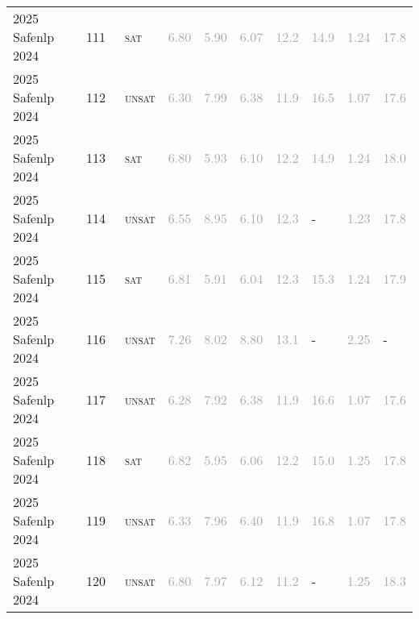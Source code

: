 \begin{center}
{\begin{longtable}{@{}llllllllll@{}}
2025 Safenlp 2024 & 111 & ~\textsc{sat} & \textcolor{darkgray}{6.80} & \textcolor{darkgray}{5.90} & \textcolor{darkgray}{6.07} & \textcolor{darkgray}{12.2} & \textcolor{darkgray}{14.9} & \textcolor{darkgray}{1.24} & \textcolor{darkgray}{17.8} \\
2025 Safenlp 2024 & 112 & ~\textsc{unsat} & \textcolor{darkgray}{6.30} & \textcolor{darkgray}{7.99} & \textcolor{darkgray}{6.38} & \textcolor{darkgray}{11.9} & \textcolor{darkgray}{16.5} & \textcolor{darkgray}{1.07} & \textcolor{darkgray}{17.6} \\
2025 Safenlp 2024 & 113 & ~\textsc{sat} & \textcolor{darkgray}{6.80} & \textcolor{darkgray}{5.93} & \textcolor{darkgray}{6.10} & \textcolor{darkgray}{12.2} & \textcolor{darkgray}{14.9} & \textcolor{darkgray}{1.24} & \textcolor{darkgray}{18.0} \\
2025 Safenlp 2024 & 114 & ~\textsc{unsat} & \textcolor{darkgray}{6.55} & \textcolor{darkgray}{8.95} & \textcolor{darkgray}{6.10} & \textcolor{darkgray}{12.3} & - & \textcolor{darkgray}{1.23} & \textcolor{darkgray}{17.8} \\
2025 Safenlp 2024 & 115 & ~\textsc{sat} & \textcolor{darkgray}{6.81} & \textcolor{darkgray}{5.91} & \textcolor{darkgray}{6.04} & \textcolor{darkgray}{12.3} & \textcolor{darkgray}{15.3} & \textcolor{darkgray}{1.24} & \textcolor{darkgray}{17.9} \\
2025 Safenlp 2024 & 116 & ~\textsc{unsat} & \textcolor{darkgray}{7.26} & \textcolor{darkgray}{8.02} & \textcolor{darkgray}{8.80} & \textcolor{darkgray}{13.1} & - & \textcolor{darkgray}{2.25} & - \\
2025 Safenlp 2024 & 117 & ~\textsc{unsat} & \textcolor{darkgray}{6.28} & \textcolor{darkgray}{7.92} & \textcolor{darkgray}{6.38} & \textcolor{darkgray}{11.9} & \textcolor{darkgray}{16.6} & \textcolor{darkgray}{1.07} & \textcolor{darkgray}{17.6} \\
2025 Safenlp 2024 & 118 & ~\textsc{sat} & \textcolor{darkgray}{6.82} & \textcolor{darkgray}{5.95} & \textcolor{darkgray}{6.06} & \textcolor{darkgray}{12.2} & \textcolor{darkgray}{15.0} & \textcolor{darkgray}{1.25} & \textcolor{darkgray}{17.8} \\
2025 Safenlp 2024 & 119 & ~\textsc{unsat} & \textcolor{darkgray}{6.33} & \textcolor{darkgray}{7.96} & \textcolor{darkgray}{6.40} & \textcolor{darkgray}{11.9} & \textcolor{darkgray}{16.8} & \textcolor{darkgray}{1.07} & \textcolor{darkgray}{17.8} \\
2025 Safenlp 2024 & 120 & ~\textsc{unsat} & \textcolor{darkgray}{6.80} & \textcolor{darkgray}{7.97} & \textcolor{darkgray}{6.12} & \textcolor{darkgray}{11.2} & - & \textcolor{darkgray}{1.25} & \textcolor{darkgray}{18.3} \\

\end{longtable}}
\end{center}
